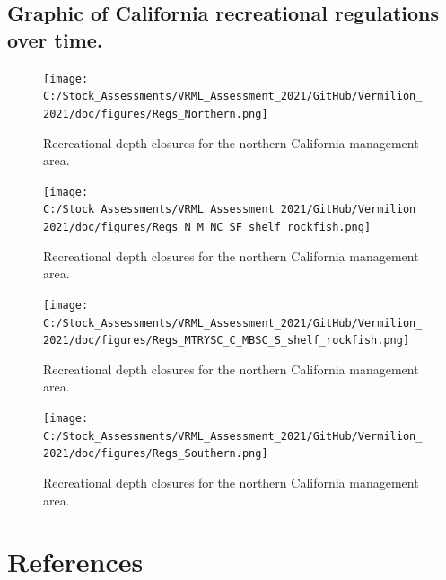 \documentclass[
  english,
  a4paper,
]{article}
\begin{document}
\clearpage

\begin{landscape}

\subsection{Graphic of California recreational regulations over time.}

\begin{figure}
\texttt{[image: C:/Stock\_Assessments/VRML\_Assessment\_2021/GitHub/Vermilion\_2021/doc/figures/Regs\_Northern.png]}
\caption{Recreational depth closures for the northern California management area.\label{fig:rec-reg-n}}
\end{figure}

\FloatBarrier

\begin{figure}
\texttt{[image: C:/Stock\_Assessments/VRML\_Assessment\_2021/GitHub/Vermilion\_2021/doc/figures/Regs\_N\_M\_NC\_SF\_shelf\_rockfish.png]}
\caption{Recreational depth closures for the northern California management area.\label{fig:rec-reg-cn}}
\end{figure}

\FloatBarrier

\begin{figure}
\texttt{[image: C:/Stock\_Assessments/VRML\_Assessment\_2021/GitHub/Vermilion\_2021/doc/figures/Regs\_MTRYSC\_C\_MBSC\_S\_shelf\_rockfish.png]}
\caption{Recreational depth closures for the northern California management area.\label{fig:rec-reg-cs}}
\end{figure}


\begin{figure}
\texttt{[image: C:/Stock\_Assessments/VRML\_Assessment\_2021/GitHub/Vermilion\_2021/doc/figures/Regs\_Southern.png]}
\caption{Recreational depth closures for the northern California management area.\label{fig:rec-reg-s}}
\end{figure}


\end{landscape}

\clearpage

\clearpage

\hypertarget{references}{%
\section{References}\label{references}}
\end{document}
